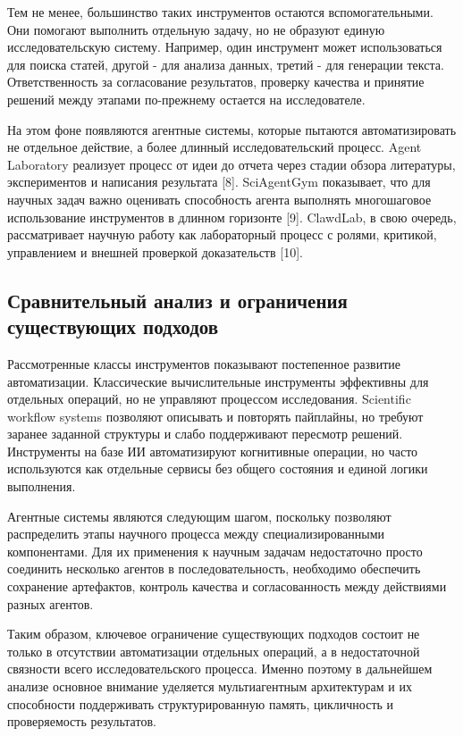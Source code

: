 Тем не менее, большинство таких инструментов остаются вспомогательными. Они помогают выполнить отдельную задачу, но не образуют единую исследовательскую систему. Например, один инструмент может использоваться для поиска статей, другой - для анализа данных, третий - для генерации текста. Ответственность за согласование результатов, проверку качества и принятие решений между этапами по-прежнему остается на исследователе.

На этом фоне появляются агентные системы, которые пытаются автоматизировать не отдельное действие, а более длинный исследовательский процесс. Agent Laboratory реализует процесс от идеи до отчета через стадии обзора литературы, экспериментов и написания результата [8]. SciAgentGym показывает, что для научных задач важно оценивать способность агента выполнять многошаговое использование инструментов в длинном горизонте [9]. ClawdLab, в свою очередь, рассматривает научную работу как лабораторный процесс с ролями, критикой, управлением и внешней проверкой доказательств [10].

\subsection{Сравнительный анализ и ограничения существующих подходов}

Рассмотренные классы инструментов показывают постепенное развитие автоматизации. Классические вычислительные инструменты эффективны для отдельных операций, но не управляют процессом исследования. Scientific workflow systems позволяют описывать и повторять пайплайны, но требуют заранее заданной структуры и слабо поддерживают пересмотр решений. Инструменты на базе ИИ автоматизируют когнитивные операции, но часто используются как отдельные сервисы без общего состояния и единой логики выполнения.

Агентные системы являются следующим шагом, поскольку позволяют распределить этапы научного процесса между специализированными компонентами. Для их применения к научным задачам недостаточно просто соединить несколько агентов в последовательность, необходимо обеспечить сохранение артефактов, контроль качества и согласованность между действиями разных агентов.

Таким образом, ключевое ограничение существующих подходов состоит не только в отсутствии автоматизации отдельных операций, а в недостаточной связности всего исследовательского процесса. Именно поэтому в дальнейшем анализе основное внимание уделяется мультиагентным архитектурам и их способности поддерживать структурированную память, цикличность и проверяемость результатов.

